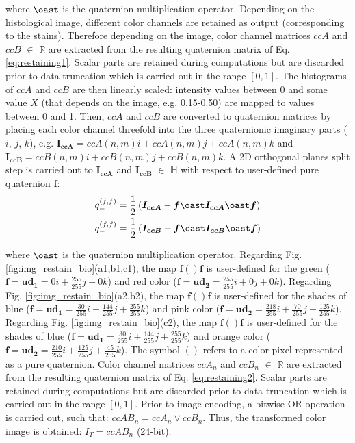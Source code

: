 \documentclass[superscriptaddress,longbibliography,aps,prl,twocolumn,10pt]{revtex4-2}
\begin{document}
\noindent
where $\oast$ is the quaternion multiplication operator. Depending on the histological image, different color channels are retained as output (corresponding to the stains). Therefore depending on the image, color channel matrices $ccA$ and $ccB$ $\in$ $\mathbb{R}$ are extracted from the resulting quaternion matrix of Eq. \ref{eq:restaining1}. Scalar parts are retained during computations but are discarded prior to data truncation which is carried out in the range $[0,1]$. The histograms of $ccA$ and $ccB$ are then linearly scaled: intensity values between 0 and some value $X$ (that depends on the image, e.g. 0.15-0.50) are mapped to values between 0 and 1. Then, $ccA$ and $ccB$ are converted to quaternion matrices by placing each color channel threefold into the three quaternionic imaginary parts ($i$, $j$, $k$), e.g. $\boldsymbol{I_{ccA}} = ccA(n,m)i+ccA(n,m)j+ccA(n,m)k$ and $\boldsymbol{I_{ccB}} = ccB(n,m)i+ccB(n,m)j+ccB(n,m)k$. A 2D orthogonal planes split step is carried out to $\boldsymbol{I_{ccA}}$ and $\boldsymbol{I_{ccB}}$ $\in$ $\mathbb{H}$ with respect to user-defined pure quaternion $\boldsymbol{f}$:
    \begin{equation} \label{eq:restaining2}
    \begin{split}
        & q_{-}^{\left(f,f\right)} = \frac{1}{2} \left(\boldsymbol{I_{ccA}} - \boldsymbol{f} \oast \boldsymbol{I_{ccA}} \oast \boldsymbol{f} \right) \\
        & q_{-}^{\left(f,f\right)} = \frac{1}{2} \left(\boldsymbol{I_{ccB}} - \boldsymbol{f} \oast \boldsymbol{I_{ccB}} \oast \boldsymbol{f} \right)
    \end{split}
    \end{equation}

\noindent
where $\oast$ is the quaternion multiplication operator. Regarding Fig. \ref{fig:img_restain_bio}(a1,b1,c1), the map $\boldsymbol{f}()\boldsymbol{f}$ is user-defined for the green ($\boldsymbol{f} = \boldsymbol{ud_{1}} = 0i + \frac{255}{255}j + 0k$) and red color ($\boldsymbol{f} = \boldsymbol{ud_{2}} = \frac{255}{255}i + 0j + 0k$). Regarding Fig. \ref{fig:img_restain_bio}(a2,b2), the map $\boldsymbol{f}()\boldsymbol{f}$ is user-defined for the shades of blue ($\boldsymbol{f} = \boldsymbol{ud_{1}} =  \frac{30}{255}i + \frac{144}{255}j + \frac{255}{255}k$) and pink color ($\boldsymbol{f} = \boldsymbol{ud_{2}} = \frac{218}{255}i + \frac{70}{255}j + \frac{125}{255}k$). Regarding Fig. \ref{fig:img_restain_bio}(c2), the map $\boldsymbol{f}()\boldsymbol{f}$ is user-defined for the shades of blue ($\boldsymbol{f} = \boldsymbol{ud_{1}} = \frac{30}{255}i + \frac{144}{255}j + \frac{255}{255}k$) and orange color ($\boldsymbol{f} = \boldsymbol{ud_{2}} = \frac{210}{255}i + \frac{125}{255}j + \frac{45}{255}k$). The symbol $()$ refers to a color pixel represented as a pure quaternion. Color channel matrices $ccA_{n}$ and $ccB_{n}$ $\in$ $\mathbb{R}$ are extracted from the resulting quaternion matrix of Eq. \ref{eq:restaining2}. Scalar parts are retained during computations but are discarded prior to data truncation which is carried out in the range $[0,1]$. Prior to image encoding, a bitwise OR operation is carried out, such that:  $ccAB_{n} = ccA_{n} \lor ccB_{n}$. Thus, the transformed color image is obtained: $I_{T} = ccAB_{n}$ (24-bit).
\end{document}
